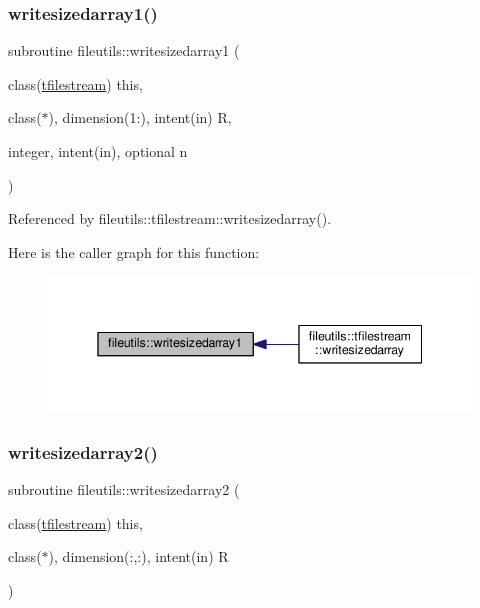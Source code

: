 \subsubsection{\texorpdfstring{writesizedarray1()}{writesizedarray1()}}
{\footnotesize\ttfamily subroutine fileutils\+::writesizedarray1 (\begin{DoxyParamCaption}\item[{class(\mbox{\hyperlink{structfileutils_1_1tfilestream}{tfilestream}})}]{this,  }\item[{class($\ast$), dimension(1\+:), intent(in)}]{R,  }\item[{integer, intent(in), optional}]{n }\end{DoxyParamCaption})\hspace{0.3cm}{\ttfamily [private]}}



Referenced by fileutils\+::tfilestream\+::writesizedarray().

Here is the caller graph for this function\+:
\nopagebreak
\begin{figure}[H]
\begin{center}
\leavevmode
\includegraphics[width=342pt]{namespacefileutils_a416e6d6a5f7a1dfc3da764788ecaac59_icgraph}
\end{center}
\end{figure}
\mbox{\label{namespacefileutils_aae72a2f6c28cf65ba7b21cd90f399eeb}} 
\subsubsection{\texorpdfstring{writesizedarray2()}{writesizedarray2()}}
{\footnotesize\ttfamily subroutine fileutils\+::writesizedarray2 (\begin{DoxyParamCaption}\item[{class(\mbox{\hyperlink{structfileutils_1_1tfilestream}{tfilestream}})}]{this,  }\item[{class($\ast$), dimension(\+:,\+:), intent(in)}]{R }\end{DoxyParamCaption})\hspace{0.3cm}{\ttfamily [private]}}



